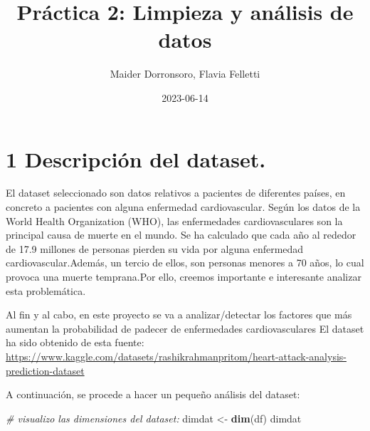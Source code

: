 \documentclass[
]{article}
\title{Práctica 2: Limpieza y análisis de datos}
\author{Maider Dorronsoro, Flavia Felletti}
\date{2023-06-14}
\newenvironment{Shaded}{\begin{snugshade}}{\end{snugshade}}
\newcommand{\CommentTok}[1]{\textcolor[rgb]{0.56,0.35,0.01}{\textit{#1}}}
\newcommand{\FunctionTok}[1]{\textcolor[rgb]{0.13,0.29,0.53}{\textbf{#1}}}
\newcommand{\NormalTok}[1]{#1}
\newcommand{\OtherTok}[1]{\textcolor[rgb]{0.56,0.35,0.01}{#1}}
\newcommand{\SpecialCharTok}[1]{\textcolor[rgb]{0.81,0.36,0.00}{\textbf{#1}}}
\newcommand{\StringTok}[1]{\textcolor[rgb]{0.31,0.60,0.02}{#1}}
\begin{document}
\maketitle

{
\setcounter{tocdepth}{2}
\tableofcontents
}
\newpage{}

\hypertarget{descripciuxf3n-del-dataset.}{%
\section{1 Descripción del dataset.}\label{descripciuxf3n-del-dataset.}}

El dataset seleccionado son datos relativos a pacientes de diferentes
países, en concreto a pacientes con alguna enfermedad cardiovascular.
Según los datos de la World Health Organization (WHO), las enfermedades
cardiovasculares son la principal causa de muerte en el mundo. Se ha
calculado que cada año al rededor de 17.9 millones de personas pierden
su vida por alguna enfermedad cardiovascular.Además, un tercio de ellos,
son personas menores a 70 años, lo cual provoca una muerte temprana.Por
ello, creemos importante e interesante analizar esta problemática.

Al fin y al cabo, en este proyecto se va a analizar/detectar los
factores que más aumentan la probabilidad de padecer de enfermedades
cardiovasculares El dataset ha sido obtenido de esta fuente:
\url{https://www.kaggle.com/datasets/rashikrahmanpritom/heart-attack-analysis-prediction-dataset}

\begin{Shaded}
\end{Shaded}

A continuación, se procede a hacer un pequeño análisis del dataset:

\begin{Shaded}
\begin{Highlighting}[]
\CommentTok{\# visualizo las dimensiones del dataset:}
\NormalTok{dimdat }\OtherTok{\textless{}{-}} \FunctionTok{dim}\NormalTok{(df)}
\NormalTok{dimdat}
\end{Highlighting}
\end{Shaded}
\end{document}
